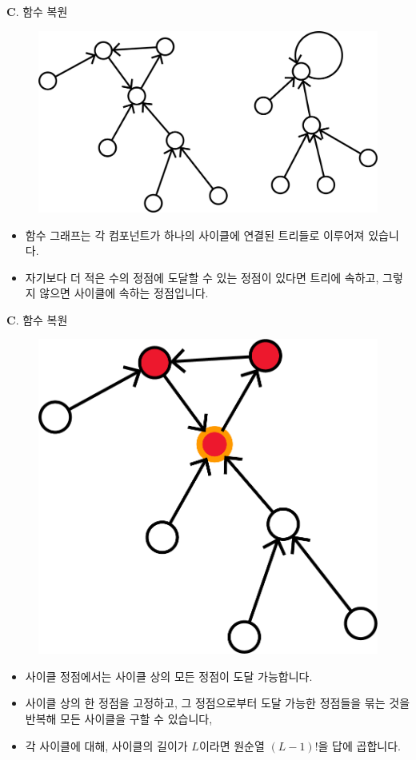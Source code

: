 \begin{frame}{\textbf{C}. 함수 복원}
    \begin{figure}[h!]
        \centering
        \includegraphics[width=0.5\linewidth]{../images/function-restore/fx-1n.png}
    \end{figure}
    \begin{itemize}
        \item 함수 그래프는 각 컴포넌트가 하나의 사이클에 연결된 트리들로 이루어져 있습니다.
        \item 자기보다 더 적은 수의 정점에 도달할 수 있는 정점이 있다면 트리에 속하고, 그렇지 않으면 사이클에 속하는 정점입니다.
    \end{itemize}
\end{frame}
\begin{frame}{\textbf{C}. 함수 복원}
    \begin{figure}[h!]
        \centering
        \includegraphics[width=0.35\linewidth]{../images/function-restore/fx-2n.png}
    \end{figure}
    \begin{itemize}
        \item 사이클 정점에서는 사이클 상의 모든 정점이 도달 가능합니다.
        \item 사이클 상의 한 정점을 고정하고, 그 정점으로부터 도달 가능한 정점들을 묶는 것을 반복해 모든 사이클을 구할 수 있습니다,
        \item 각 사이클에 대해, 사이클의 길이가 $L$이라면 원순열 $(L-1)!$을 답에 곱합니다.
    \end{itemize}
\end{frame}
